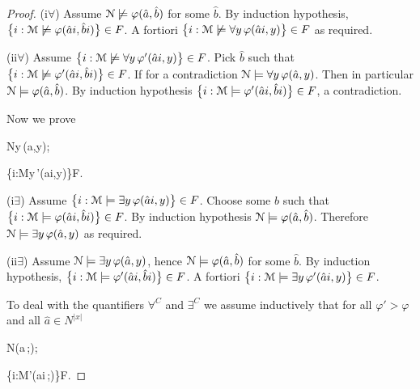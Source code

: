 \documentclass[11pt,oneside]{amsart}
\theoremstyle{plain}
\theoremstyle{remark}
\begin{document}
\begin{proof}
  (\textsf{i}$\forall$)
  Assume ${\EuScript N}\not\models\varphi(\hat a,\hat b)$ for some $\hat b$.
  By induction hypothesis, $\big\{ i: {\EuScript M}\not\models\varphi(\hat ai,\hat bi)\big\}\in F$.
  A fortiori $\big\{ i:{\EuScript M}\not\models\forall y\,\varphi(\hat ai,y)\big\}\in F$ as required.


  (\textsf{ii}$\forall$)
  Assume $\big\{ i:{\EuScript M}\not\models\forall y\,\varphi'(\hat ai,y)\big\}\in F$.
  Pick $\hat b$ such that $\big\{ i:{\EuScript M}\not\models\varphi'(\hat ai,\hat bi)\big\}\in F$.
  If for a contradiction ${\EuScript N}\models\forall y\,\varphi(\hat a,y)$.
  Then in particular ${\EuScript N}\models\varphi(\hat a,\hat b)$.
  By induction hypothesis $\big\{ i:{\EuScript M}\models\varphi'(\hat ai,\hat bi)\big\}\in F$, a contradiction.

  Now we prove

  {\Rightarrow}
  {{\EuScript N}\models\exists y\,\varphi(\hat a,y)};

  {\Rightarrow}
  {\big\{i:{\EuScript M}\models\exists y\,\varphi'(\hat ai,y)\big\}\in F}.


  (\textsf{i}$\exists$) Assume $\big\{ i:{\EuScript M}\models\exists y\,\varphi(\hat ai,y)\big\}\in F$.
  Choose some $\hat b$ such that $\big\{ i:{\EuScript M}\models\varphi(\hat ai,\hat bi)\big\}\in F$.
  By induction hypothesis ${\EuScript N}\models\varphi(\hat a,\hat b)$.
  Therefore ${\EuScript N}\models\exists y\,\varphi(\hat a,y)$ as required.

  (\textsf{ii}$\exists$) Assume ${\EuScript N}\models\exists y\,\varphi(\hat a,y)$, hence ${\EuScript N}\models\varphi(\hat a,\hat b)$ for some $\hat b$.
  By induction hypothesis, $\big\{ i: {\EuScript M}\models\varphi'(\hat ai,\hat bi)\big\}\in F$.
  A fortiori $\big\{ i:{\EuScript M}\models\exists y\,\varphi'(\hat ai,y)\big\}\in F$.
  
  To deal with the quantifiers $\forall^C$ and $\exists^C$ we assume inductively that for all $\varphi'>\varphi$ and all $\hat a\in N^{|x|}$

  {\Rightarrow}
  {{\EuScript N}\models\varphi(\hat a\,;\alpha)};

  {\Rightarrow}
  {\big\{i:{\EuScript M}\models\varphi'(\hat ai\,;\alpha)\big\}\in F}.
    

\end{proof}
\end{document}
